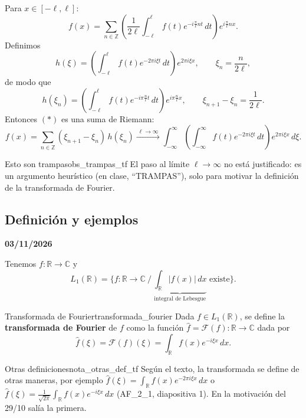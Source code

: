 Para $x \in [-\ell, \ell]$:
\begin{equation}
f(x) = \sum_{n\in\mathbb{Z}}\left(\frac{1}{2\ell}\int_{-\ell}^{\ell}f(t)e^{-i\frac{\pi}{\ell}nt}\,dt\right)e^{i\frac{\pi}{\ell}nx}. \tag{$\ast$}
\end{equation}
Definimos
\[
h(\xi) = \left(\int_{-\ell}^{\ell}f(t)e^{-2\pi i\xi t}\,dt\right)e^{2\pi i\xi x}, \qquad \xi_n = \frac{n}{2\ell},
\]
de modo que
\[
h(\xi_n) = \left(\int_{-\ell}^{\ell}f(t)e^{-i\pi\frac{n}{\ell}t}\,dt\right)e^{i\pi\frac{n}{\ell}x}, \qquad \xi_{n+1} - \xi_n = \frac{1}{2\ell}.
\]
Entonces $(\ast)$ es una suma de Riemann:
\[
f(x) = \sum_{n\in\mathbb{Z}}(\xi_{n+1} - \xi_n)\,h(\xi_n) \xrightarrow{\ \ell\to\infty\ } \int_{-\infty}^{\infty}\left(\int_{-\infty}^{\infty}f(t)e^{-2\pi i\xi t}\,dt\right)e^{2\pi i\xi x}\,d\xi.
\]

\begin{observacion}{Esto son trampas}{obs_trampas_tf}
El paso al límite $\ell \to \infty$ no está justificado: es un argumento heurístico (en clase, ``TRAMPAS''), solo para motivar la definición de la transformada de Fourier.
\end{observacion}

\subsection{Definición y ejemplos}

\textbf{03/11/2026}

Tenemos $f : \mathbb{R} \to \mathbb{C}$ y
\[
L_1(\mathbb{R}) = \Big\{f : \mathbb{R} \to \mathbb{C} \ \Big/\ \underbrace{\int_{\mathbb{R}}|f(x)|\,dx}_{\text{integral de Lebesgue}} \text{ existe}\Big\}.
\]

\begin{definicion}{Transformada de Fourier}{transformada_fourier}
Dada $f \in L_1(\mathbb{R})$, se define la \textbf{transformada de Fourier} de $f$ como la función $\hat{f} = \mathcal{F}(f) : \mathbb{R} \to \mathbb{C}$ dada por
\[
\hat{f}(\xi) = \mathcal{F}(f)(\xi) = \int_{\mathbb{R}} f(x)e^{-i\xi x}\,dx.
\]
\end{definicion}

\begin{nota}{Otras definiciones}{nota_otras_def_tf}
Según el texto, la transformada se define de otras maneras, por ejemplo $\hat{f}(\xi) = \int_{\mathbb{R}}f(x)e^{-2\pi i\xi x}\,dx$ o $\hat{f}(\xi) = \frac{1}{\sqrt{2\pi}}\int_{\mathbb{R}}f(x)e^{-i\xi x}\,dx$ (AF\_2\_1, diapositiva 1). En la motivación del 29/10 salía la primera.
\end{nota}

